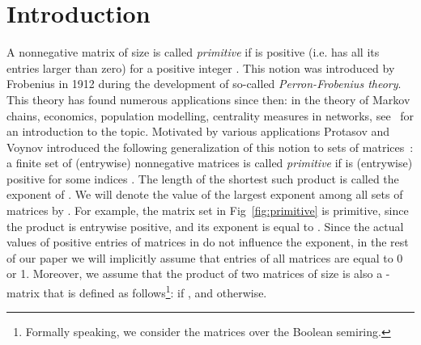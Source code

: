\documentclass[a4paper,USenglish]{lipics}
\theoremstyle{definition}
\begin{document}
\section{Introduction}
A nonnegative matrix  of size  is called \emph{primitive} if  is positive (i.e. has all its entries larger than zero) for a positive integer . This notion was introduced by Frobenius in 1912 during the development of so-called \emph{Perron-Frobenius theory}. This theory has found numerous applications since then: in the theory of Markov chains, economics, population modelling, centrality measures in networks, see~\cite[Chapter 8]{Meyer2000} for an introduction to the topic.
Motivated by various applications Protasov and Voynov introduced the following generalization of this notion to sets of matrices~\cite{PrVo2012}: 
a finite set of (entrywise) nonnegative matrices  is called \emph{primitive} if  is (entrywise) positive for some indices . The length of the shortest such product is called the exponent  of . We will denote the value of the largest exponent among all sets of  matrices by . For example, the matrix set  in Fig~\ref{fig:primitive} is primitive, since the product  is entrywise positive, and its exponent is equal to . Since the actual values of positive entries of matrices in  do not influence the exponent, in the rest of our paper we will implicitly assume that entries of all matrices are equal to 0 or 1. Moreover, we assume that the product  of two matrices of size  is also a -matrix that is defined as follows\footnote{Formally speaking, we consider the matrices over the Boolean semiring.}:  if , and  otherwise.
\end{document}
